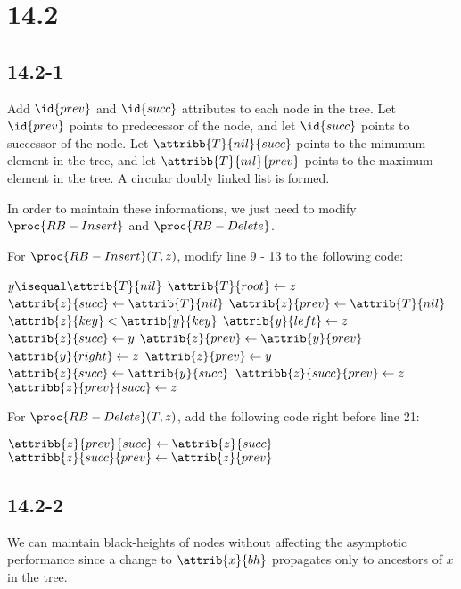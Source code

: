 \section*{14.2}

\subsection*{14.2-1}

\noindent
Add $\id{prev}$ and $\id{succ}$ attributes to each node in the tree.
Let $\id{prev}$ points to predecessor of the node, 
and let $\id{succ}$ points to successor of the node.
Let $\attribb{T}{nil}{succ}$ points to the minumum element in the tree,
and let $\attribb{T}{nil}{prev}$ points to the maximum element in the tree.
A circular doubly linked list is formed.

\noindent
In order to maintain these informations,
we just need to modify $\proc{RB-Insert}$ and $\proc{RB-Delete}$.

\noindent
For $\proc{RB-Insert}(T, z)$, modify line 9 - 13 to the following code:

\begin{codebox}
    \li \If $y \isequal \attrib{T}{nil}$
    \li \Then
            $\attrib{T}{root} \gets z$
    \li     $\attrib{z}{succ} \gets \attrib{T}{nil}$
    \li     $\attrib{z}{prev} \gets \attrib{T}{nil}$
    \li \ElseIf $\attrib{z}{key} < \attrib{y}{key}$
    \li \Then
            $\attrib{y}{left} \gets z$
    \li     $\attrib{z}{succ} \gets y$
    \li     $\attrib{z}{prev} \gets \attrib{y}{prev}$
    \li \Else
            $\attrib{y}{right} \gets z$
    \li     $\attrib{z}{prev} \gets y$
    \li     $\attrib{z}{succ} \gets \attrib{y}{succ}$
        \End
    \li     $\attribb{z}{succ}{prev} \gets z$
    \li     $\attribb{z}{prev}{succ} \gets z$
\end{codebox}

\noindent
For $\proc{RB-Delete}(T, z)$, 
add the following code right before line 21:

\begin{codebox}
    \li $\attribb{z}{prev}{succ} \gets \attrib{z}{succ}$
    \li $\attribb{z}{succ}{prev} \gets \attrib{z}{prev}$
\end{codebox}

\subsection*{14.2-2}

\noindent
We can maintain black-heights of nodes without affecting the asymptotic performance
since a change to $\attrib{x}{bh}$ propagates only to ancestors of $x$ in the tree.

